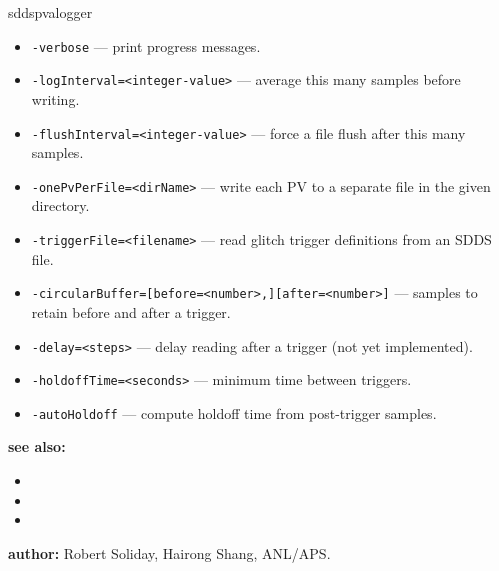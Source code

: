 \begin{sddsprog}{sddspvalogger}
\begin{itemize}
  \item {\tt -verbose} --- print progress messages.
  \item {\tt -logInterval=<integer-value>} --- average this many samples before writing.
  \item {\tt -flushInterval=<integer-value>} --- force a file flush after this many samples.
  \item {\tt -onePvPerFile=<dirName>} --- write each PV to a separate file in the given directory.
  \item {\tt -triggerFile=<filename>} --- read glitch trigger definitions from an SDDS file.
  \item {\tt -circularBuffer=[before=<number>,][after=<number>]} --- samples to retain before and after a trigger.
  \item {\tt -delay=<steps>} --- delay reading after a trigger (not yet implemented).
  \item {\tt -holdoffTime=<seconds>} --- minimum time between triggers.
  \item {\tt -autoHoldoff} --- compute holdoff time from post-trigger samples.
\end{itemize}

\item \textbf{see also:}
\begin{itemize}
  \item {}
  \item {}
  \item {}
\end{itemize}
\item \textbf{author:} Robert Soliday, Hairong Shang, ANL/APS.
\end{sddsprog}
